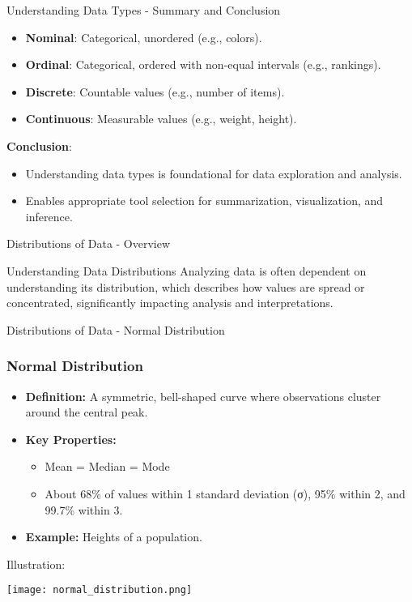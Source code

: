 \documentclass[aspectratio=169]{beamer}
\begin{document}
\begin{frame}[fragile]{Understanding Data Types - Summary and Conclusion}
    \begin{itemize}
        \item \textbf{Nominal}: Categorical, unordered (e.g., colors).
        \item \textbf{Ordinal}: Categorical, ordered with non-equal intervals (e.g., rankings).
        \item \textbf{Discrete}: Countable values (e.g., number of items).
        \item \textbf{Continuous}: Measurable values (e.g., weight, height).
    \end{itemize}
    
    \textbf{Conclusion}:
    \begin{itemize}
        \item Understanding data types is foundational for data exploration and analysis.
        \item Enables appropriate tool selection for summarization, visualization, and inference.
    \end{itemize}
\end{frame}

\begin{frame}[fragile]{Distributions of Data - Overview}
    \begin{block}{Understanding Data Distributions}
        Analyzing data is often dependent on understanding its distribution, which describes how values are spread or concentrated, significantly impacting analysis and interpretations.
    \end{block}
\end{frame}

\begin{frame}[fragile]{Distributions of Data - Normal Distribution}
    \frametitle{Normal Distribution}
    \begin{itemize}
        \item \textbf{Definition:} A symmetric, bell-shaped curve where observations cluster around the central peak.
        \item \textbf{Key Properties:}
        \begin{itemize}
            \item Mean = Median = Mode
            \item About 68\% of values within 1 standard deviation (σ), 95\% within 2, and 99.7\% within 3.
        \end{itemize}
        \item \textbf{Example:} Heights of a population.
    \end{itemize}
    
    \begin{block}{Illustration:}
    \begin{center}
    \texttt{[image: normal\_distribution.png]} %
    \end{center}
    \end{block}
\end{frame}
\end{document}
